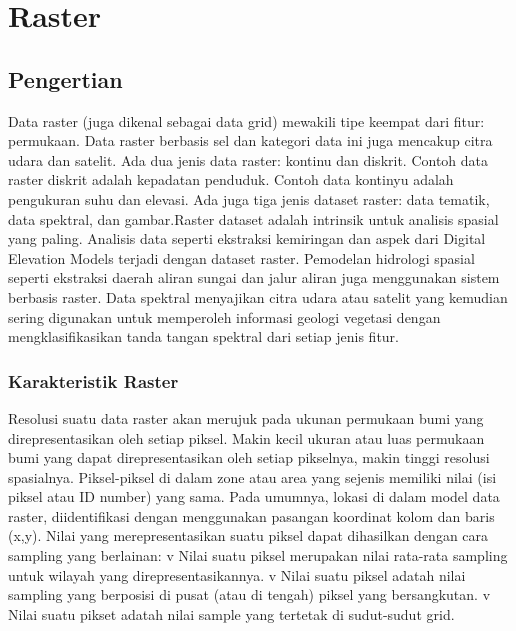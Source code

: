  \section{Raster}
 \subsection{Pengertian}
Data raster (juga dikenal sebagai data grid) mewakili tipe keempat dari fitur: permukaan. 
Data raster berbasis sel dan kategori data ini juga mencakup citra udara dan satelit. 
Ada dua jenis data raster: kontinu dan diskrit. Contoh data raster diskrit adalah kepadatan penduduk. 
Contoh data kontinyu adalah pengukuran suhu dan elevasi. Ada juga tiga jenis dataset raster: data tematik, 
data spektral, dan gambar.Raster dataset adalah intrinsik untuk analisis spasial yang paling. 
Analisis data seperti ekstraksi kemiringan dan aspek dari Digital Elevation Models terjadi dengan dataset raster.
Pemodelan hidrologi spasial seperti ekstraksi daerah aliran sungai dan jalur aliran juga menggunakan sistem berbasis raster.
Data spektral menyajikan citra udara atau satelit yang kemudian sering digunakan 
untuk memperoleh informasi geologi vegetasi dengan mengklasifikasikan tanda tangan spektral dari setiap jenis fitur.

\subsubsection{Karakteristik Raster}
Resolusi suatu data raster akan merujuk pada ukunan permukaan bumi yang direpresentasikan oleh setiap piksel. 
Makin kecil ukuran atau luas permukaan bumi yang dapat direpresentasikan oleh setiap pikselnya, makin tinggi resolusi spasialnya.
Piksel-piksel di dalam zone atau area yang sejenis memiliki nilai (isi piksel atau ID number) yang sama.
Pada umumnya, lokasi di dalam model data raster, diidentifikasi dengan menggunakan pasangan koordinat kolom dan baris (x,y).
Nilai yang merepresentasikan suatu piksel dapat dihasilkan dengan cara sampling yang berlainan:
v  Nilai suatu piksel merupakan nilai rata-rata sampling untuk wilayah yang direpresentasikannya.
v  Nilai suatu piksel adatah nilai sampling yang berposisi di pusat (atau di tengah) piksel yang bersangkutan.
v  Nilai suatu pikset adatah nilai sample yang tertetak di sudut-sudut grid.

